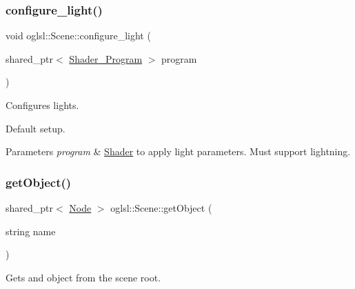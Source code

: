 \mbox{\label{classoglsl_1_1_scene_a91c975ee306374f17b9f348801f2ce3e}} 
\subsubsection{\texorpdfstring{configure\+\_\+light()}{configure\_light()}}
{\footnotesize\ttfamily void oglsl\+::\+Scene\+::configure\+\_\+light (\begin{DoxyParamCaption}\item[{shared\+\_\+ptr$<$ \mbox{\hyperlink{classoglsl_1_1_shader___program}{Shader\+\_\+\+Program}} $>$}]{program }\end{DoxyParamCaption})\hspace{0.3cm}{\ttfamily [virtual]}}



Configures lights. 

Default setup. 
\begin{DoxyParams}{Parameters}
{\em program} & \mbox{\hyperlink{classoglsl_1_1_shader}{Shader}} to apply light parameters. Must support lightning. \\
\hline
\end{DoxyParams}
\mbox{\label{classoglsl_1_1_scene_a10b398b3e59b41c5fb0dbadb8120e0f3}} 
\subsubsection{\texorpdfstring{get\+Object()}{getObject()}}
{\footnotesize\ttfamily shared\+\_\+ptr$<$ \mbox{\hyperlink{classoglsl_1_1_node}{Node}} $>$ oglsl\+::\+Scene\+::get\+Object (\begin{DoxyParamCaption}\item[{string}]{name }\end{DoxyParamCaption})\hspace{0.3cm}{\ttfamily [inline]}}



Gets and object from the scene root. 

\mbox{\label{classoglsl_1_1_scene_a7884a3f2b7900aaf348a62ad23223c8e}} 
